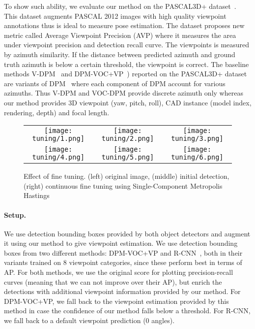 To show such ability, we evaluate our method on the PASCAL3D+
dataset~\cite{Xiang14}. This dataset augments PASCAL 2012 images with
high quality viewpoint annotations thus is ideal to measure pose
estimation. The dataset proposes new metric called Average Viewpoint
Precision (AVP) where it measures the area under viewpoint precision
and detection recall curve. The viewpoints is measured by azimuth
similarity. If the distance between predicted azimuth and ground truth
azimuth is below a certain threshold, the viewpoint is correct.
The baseline methods V-DPM~\cite{Xiang14} and
DPM-VOC+VP~\cite{Pepik12}) reported on the PASCAL3D+ dataset are
variants of DPM~\cite{Felzenszwalb10} where each component of DPM
account for various azimuths. Thus V-DPM and VOC-DPM provide discrete
azimuth only whereas our method provides 3D viewpoint (yaw, pitch,
roll), CAD instance (model index, rendering, depth) and focal length.
%
\begin{figure}[t]
 \begin{center}
    \setlength\tabcolsep{0pt}
    \begin{tabular}{ccc}
   \texttt{[image: tuning/1.png]} &
   \texttt{[image: tuning/2.png]} &
   \texttt{[image: tuning/3.png]} \\[-5pt]
   \texttt{[image: tuning/4.png]} &
   \texttt{[image: tuning/5.png]} &
   \texttt{[image: tuning/6.png]} \\[-5pt]
   \end{tabular}
 \end{center}
 \caption{Effect of fine tuning. (left) original image, (middle) initial detection, (right) continuous fine tuning using Single-Component Metropolis Hastings}
 \label{fig:tuning}
\end{figure}

\paragraph{Setup.}
We use detection bounding boxes provided by both object detectors and
augment it using our method to give viewpoint estimation. We use
detection bounding boxes from two different methods:
DPM-VOC+VP\cite{Pepik12} and R-CNN~\cite{Girshick14}, both in their
variants trained on 8 viewpoint categories, since these perform best
in terms of AP. For both methods,
we use the original score for plotting precision-recall curves
(meaning that we can not improve over their AP), but
enrich the detections with additional viewpoint information provided
by our method. For DPM-VOC+VP, we fall back to the viewpoint
estimation provided by this method in case the confidence of our
method falls below a threshold. For R-CNN, we fall back to a default
viewpoint prediction ($0$ angles).

